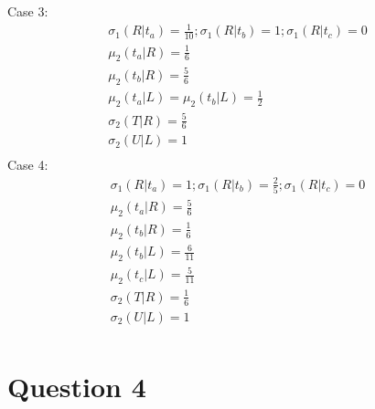 \documentclass[10pt, a4paper]{article}
\begin{document}
      Case 3:
      \begin{gather*}
        \sigma_1(R|t_a)=\frac{1}{10}; \sigma_1(R|t_b) = 1; \sigma_1(R|t_c) = 0 \\
        \mu_2(t_a|R) = \frac{1}{6} \\
        \mu_2(t_b|R) = \frac{5}{6} \\
        \mu_2(t_a|L) = \mu_2(t_b|L) = \frac{1}{2} \\
        \sigma_2(T|R) = \frac{5}{6} \\
        \sigma_2(U|L) = 1 \\
      \end{gather*}
      Case 4: 
      \begin{gather*}
        \sigma_1(R|t_a) = 1; \sigma_1(R|t_b) = \frac{2}{5}; \sigma_1(R|t_c) = 0 \\
        \mu_2(t_a|R) = \frac{5}{6} \\
        \mu_2(t_b|R) = \frac{1}{6} \\
        \mu_2(t_b|L) = \frac{6}{11} \\
        \mu_2(t_c|L) = \frac{5}{11} \\
        \sigma_2(T|R) = \frac{1}{6} \\
        \sigma_2(U|L) = 1 \\
      \end{gather*}
  \section*{Question 4}
\end{document}
